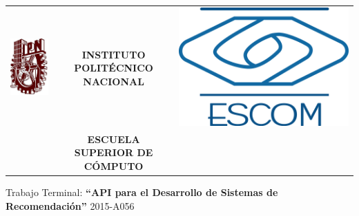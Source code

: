 \begin{titlepage}
	\begin{center}
		\begin{tabular}{r c l}
			\includegraphics[scale=.20]{images/ipn} & \textbf{INSTITUTO POLIT\'ECNICO NACIONAL} & \includegraphics[scale=.20]{images/escom} \\
			& \textbf{ESCUELA SUPERIOR DE C\'OMPUTO}
		\end{tabular}
	\end{center}
	
	\vspace{1.5cm}
	\begin{center}
		\large Trabajo Terminal: \linebreak
		\large \textbf{``API para el Desarrollo de Sistemas de Recomendaci\'on''} \linebreak
		\large 2015-A056
		

\end{center}
\end{titlepage}
